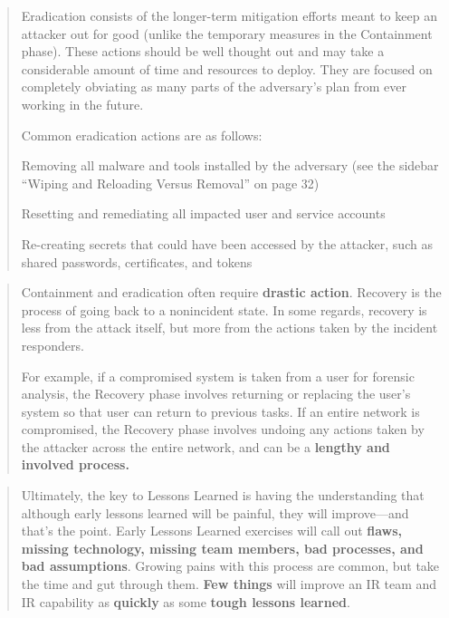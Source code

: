 \documentclass[Screen16to9,17pt]{foils}
\begin{document}


\begin{quote}
Eradication consists of the longer-term mitigation efforts meant to keep an attacker
out for good (unlike the temporary measures in the Containment phase). These
actions should be well thought out and may take a considerable amount of time and
resources to deploy. They are focused on completely obviating as many parts of the
adversary’s plan from ever working in the future.

Common eradication actions are as follows:
\begin{list2}
\item Removing all malware and tools installed by the adversary (see the sidebar “Wiping and Reloading Versus Removal” on page 32)
\item Resetting and remediating all impacted user and service accounts
\item Re-creating secrets that could have been accessed by the attacker, such as shared passwords, certificates, and tokens
\end{list2}
\end{quote}



\begin{quote}
Containment and eradication often require {\bf drastic action}. Recovery is the process of going back to a nonincident state. In some regards, recovery is less from the attack itself, but more from the actions taken by the incident responders.

For example, if a compromised system is taken from a user for forensic analysis, the
Recovery phase involves returning or replacing the user’s system so that user can
return to previous tasks. If an entire network is compromised, the Recovery phase
involves undoing any actions taken by the attacker across the entire network, and can
be a {\bf lengthy and involved process.}
\end{quote}

\begin{list2}
    \item
\end{list2}



\begin{quote}
Ultimately, the key to Lessons Learned is having the understanding that although early lessons learned will be painful, they will improve—and that’s the point. Early Lessons Learned exercises will call out {\bf flaws, missing technology, missing team members, bad processes, and bad assumptions}. Growing pains with this process are common, but take the time and gut through them. {\bf Few things} will improve an IR team and IR capability as {\bf quickly} as some {\bf tough lessons learned}.
\end{quote}
\end{document}
